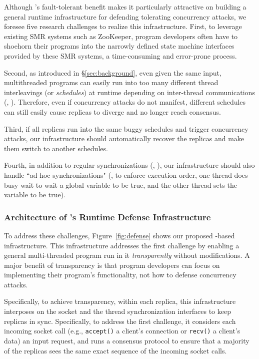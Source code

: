 Although \smr's fault-tolerant benefit makes it particularly attractive
on building a general runtime infrastructure for defending tolerating 
concurrency attacks, we foresee five research challenges to realize this 
infrastructure. First, to leverage existing SMR systems such as ZooKeeper, 
program developers often have to shoehorn their programs into the 
narrowly defined state machine interfaces provided by these SMR systems, a 
time-consuming and error-prone process.

Second, as introduced in \S\ref{sec:background}, even given the same 
input, multithreaded programs can easily run into too many different thread 
interleavings (or \emph{schedules}) at runtime depending on inter-thread 
communications (\eg, \mutexlock). Therefore, even if concurrency attacks do not 
manifest, different schedules can still easily cause replicas to diverge and no 
longer reach consensus. 


Third, if all replicas run into the same buggy schedules and trigger 
concurrency attacks, our infrastructure should automatically recover the 
replicas and make them switch to another schedules.

Fourth, in addition to regular synchronizations (\eg, \mutexlock), our 
infrastructure should also handle ``ad-hoc synchronizations" (\eg, to enforce 
execution order, one thread does busy wait to wait a global variable to be true, 
and the other thread sets the variable to be true).

\vspace{-.15in}\subsubsection{Architecture of \xxx's Runtime Defense 
Infrastructure} 
\label{sec:defense-arch}\vspace{-.075in}

To address these challenges, Figure~\ref{fig:defense} shows our proposed 
\smr-based infrastructure. This infrastructure addresses the first challenge by 
enabling a general multi-threaded program run in it \emph{transparently} 
without modifications. A major benefit of transparency is that program 
developers can focus on implementing their program's functionality, not how to 
defense concurrency attacks.

Specifically, to achieve transparency, within each \smr replica, this 
infrastructure interposes on the socket and the thread synchronization 
interfaces to keep replicas in sync. Specifically, to address the first 
challenge, it considers each incoming socket call (e.g., \texttt{accept()} a 
client's connection or \texttt{recv()} a client's data) an input request, and 
runs a \paxos consensus protocol to ensure that a majority of the replicas sees 
the same exact sequence of the incoming socket calls.

